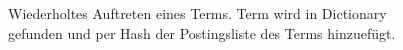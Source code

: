 \begin{figure}[ht]
    \caption{ Wiederholtes Auftreten eines Terms. Term wird in Dictionary gefunden und per Hash der Postingsliste des Terms hinzuefügt.}
   \label{fig:subfigure2}
\end{figure}


